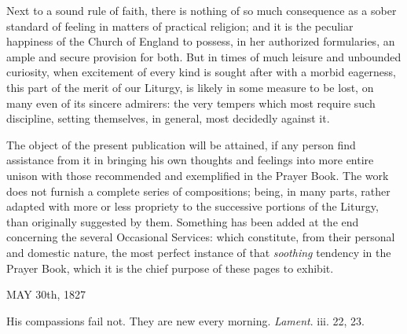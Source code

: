 
Next to a sound rule of faith, there is nothing of so much consequence as a sober standard of feeling in matters of practical religion; and it is the peculiar happiness of the Church of England to possess, in her authorized formularies, an ample and secure provision for both. But in times of much leisure and unbounded curiosity, when excitement of every kind is sought after with a morbid eagerness, this part of the merit of our Liturgy, is likely in some measure to be lost, on many even of its sincere admirers: the very tempers which most require such discipline, setting themselves, in general, most decidedly against it.

The object of the present publication will be attained, if any person find assistance from it in bringing his own thoughts and feelings into more entire unison with those recommended and exemplified in the Prayer Book. The work does not furnish a complete series of compositions; being, in many parts, rather adapted with more or less propriety to the successive portions of the Liturgy, than originally suggested by them. Something has been added at the end concerning the several Occasional Services: which constitute, from their personal and domestic nature, the most perfect instance of that \emph{soothing} tendency in the Prayer Book, which it is the chief purpose of these pages to exhibit.

MAY 30th, 1827


His compassions fail not. They are new every morning. \emph{Lament}. iii. 22, 23.


